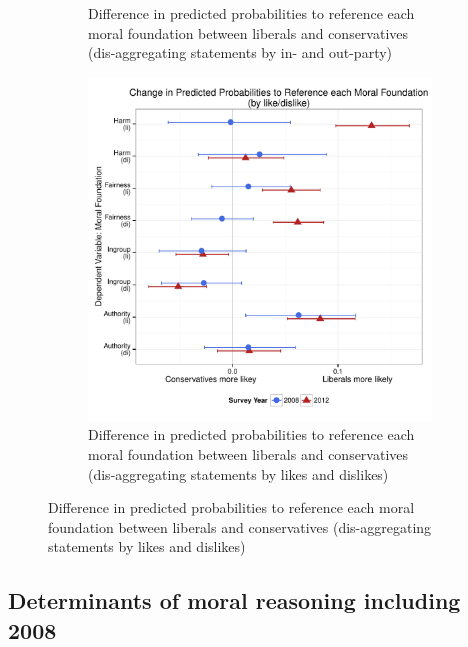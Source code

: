 \documentclass[12pt]{article}
\begin{document}
\begin{figure}[ht]
\begin{subfigure}[t]{0.49\textwidth}
\caption{Difference in predicted probabilities to reference each moral foundation between liberals and conservatives (dis-aggregating statements by in- and out-party)}\label{fig:appD5inout}
  \end{subfigure}
  \begin{subfigure}[t]{0.49\textwidth}
    \includegraphics[scale=.35]{../calc/fig/appD6lidi.pdf}
\caption{Difference in predicted probabilities to reference each moral foundation between liberals and conservatives (dis-aggregating statements by likes and dislikes)}\label{fig:appD6lidi}
  \end{subfigure}
\end{figure}


\clearpage
\subsection{Determinants of moral reasoning including 2008}
\end{document}
